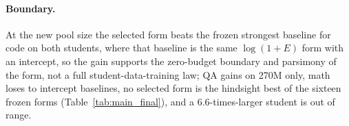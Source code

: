\paragraph{Boundary.} At the new pool size the selected form beats the
frozen strongest baseline for code on both students, where that
baseline is the same $\log(1+E)$ form with an intercept, so the gain
supports the zero-budget boundary and parsimony of the form, not a
full student-data-training law; QA gains on 270M only, math loses to intercept baselines, no selected form is the hindsight best of the sixteen frozen forms (Table~\ref{tab:main_final}), and a 6.6-times-larger student is out of range.
